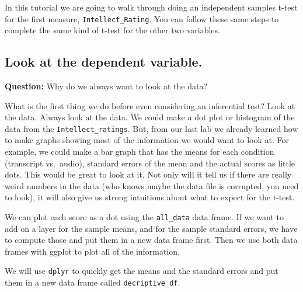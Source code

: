 \documentclass[
]{book}
\begin{document}
In this tutorial we are going to walk through doing an independent samples t-test for the first measure, \texttt{Intellect\_Rating}. You can follow these same steps to complete the same kind of t-test for the other two variables.

\hypertarget{look-at-the-dependent-variable.}{%
\subsection{Look at the dependent variable.}\label{look-at-the-dependent-variable.}}

\textbf{Question:} Why do we always want to look at the data?

What is the first thing we do before even considering an inferential test? Look at the data. Always look at the data. We could make a dot plot or histogram of the data from the \texttt{Intellect\_ratings}. But, from our last lab we already learned how to make graphs showing most of the information we would want to look at. For example, we could make a bar graph that has the means for each condition (transcript vs.~audio), standard errors of the mean and the actual scores as little dots. This would be great to look at it. Not only will it tell us if there are really weird numbers in the data (who knows maybe the data file is corrupted, you need to look), it will also give us strong intuitions about what to expect for the t-test.

We can plot each score as a dot using the \texttt{all\_data} data frame. If we want to add on a layer for the sample means, and for the sample standard errors, we have to compute those and put them in a new data frame first. Then we use both data frames with ggplot to plot all of the information.

We will use \texttt{dplyr} to quickly get the means and the standard errors and put them in a new data frame called \texttt{decriptive\_df}.
\end{document}

